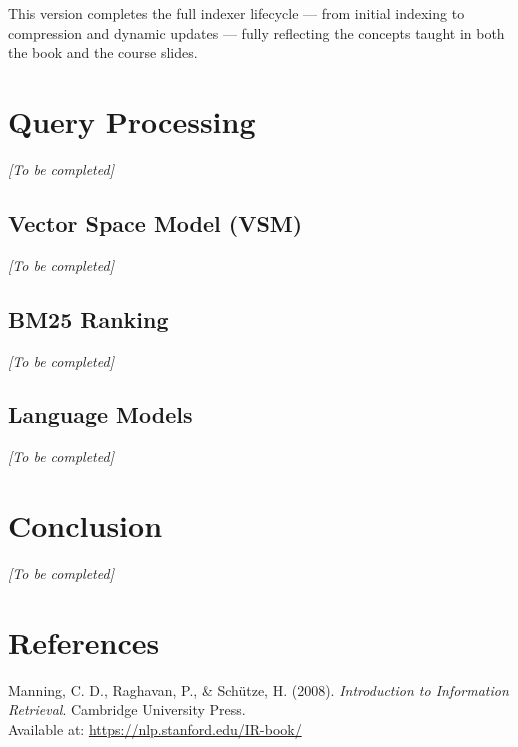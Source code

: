 \documentclass[11pt,a4paper]{article}
\begin{document}
This version completes the full indexer lifecycle — from initial indexing to compression and dynamic updates —
fully reflecting the concepts taught in both the book and the course slides.

\section{Query Processing}
\label{sec:query}

\textit{[To be completed]}

\subsection{Vector Space Model (VSM)}
\label{subsec:vsm}

\textit{[To be completed]}

\subsection{BM25 Ranking}
\label{subsec:bm25}

\textit{[To be completed]}

\subsection{Language Models}
\label{subsec:lm}

\textit{[To be completed]}

\section{Conclusion}
\label{sec:conclusion}

\textit{[To be completed]}

\vspace{1cm}

\section*{References}

\noindent
Manning, C. D., Raghavan, P., \& Schütze, H. (2008). \textit{Introduction to Information Retrieval}. Cambridge University Press. \\
Available at: \url{https://nlp.stanford.edu/IR-book/}
\end{document}
